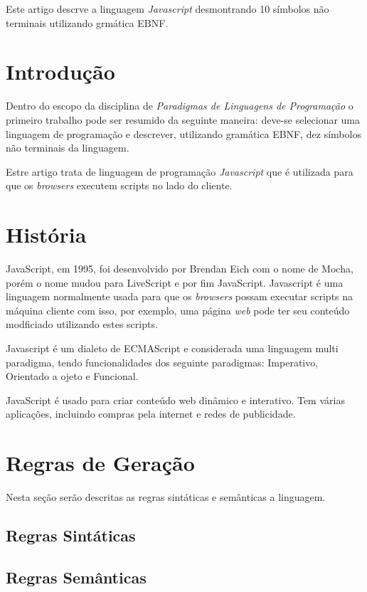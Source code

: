 \documentclass[
	article,			%
	11pt,				%
	oneside,			%
	a4paper,			%
	english,			%
	brazil,				%
	]{abntex2}
\begin{document}
\frenchspacing 

\maketitle

\begin{resumoumacoluna}
    
    Este artigo descrve a linguagem \emph{Javascript} desmontrando 10 símbolos
    não terminais utilizando grmática EBNF. 

 \vspace{\onelineskip}
 
 \noindent
\end{resumoumacoluna}

\textual

\section*{Introdução}

    Dentro do escopo da disciplina de \emph{Paradigmas de Linguagens de
    Programação} o primeiro trabalho pode ser resumido da seguinte maneira:
    deve-se selecionar uma linguagem de programação e descrever, utilizando
    gramática EBNF, dez símbolos não terminais da linguagem.
    
    Estre artigo trata de linguagem de programação \emph{Javascript} que é
    utilizada para que os \emph{browsers} executem scripts no lado do cliente.

\section{História}

    JavaScript, em 1995, foi desenvolvido por Brendan Eich com o nome de Mocha, porém o nome mudou para LiveScript e por fim JavaScript. Javascript é uma linguagem normalmente usada para que os \emph{browsers} possam executar scripts na máquina cliente com isso, por exemplo, uma página \emph{web} pode ter seu conteúdo modficiado utilizando estes scripts. 
    
    Javascript é um dialeto de ECMAScript e considerada uma linguagem multi paradigma, tendo funcionalidades dos seguinte paradigmas: Imperativo, Orientado a ojeto e Funcional.
    
    JavaScript é usado para criar conteúdo web dinâmico e interativo. Tem várias aplicações, incluindo compras pela internet e redes de publicidade.
\section{Regras de Geração}
    Nesta seção serão descritas as regras sintáticas e semânticas a linguagem.
    \subsection{Regras Sintáticas}
    \subsection{Regras Semânticas}
\end{document}

